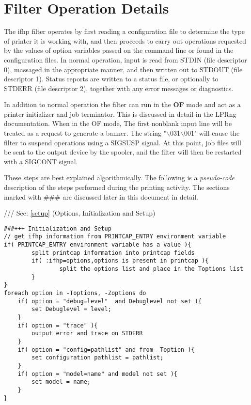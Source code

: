 \documentclass[a4paper]{article}
\begin{document}
\section{Filter Operation Details}

The
{\ttfamily ifhp}
filter operates by first reading a configuration file
to determine the type of printer it is working with,
and then proceeds to carry out operations requested by the values of
option variables passed on the command line or found in the configuration
files.
In normal operation,
input is read from 
{\ttfamily STDIN}
(file descriptor 0),
massaged in the appropriate manner,
and then written out to
{\ttfamily STDOUT} (file descriptor 1).
Status reports are written to
a status file, or optionally to
{\ttfamily STDERR} (file descriptor 2),
together with any error messages or diagnostics.

In addition to normal operation
the filter can run in the
{\bfseries OF} mode and act as a printer initializer and job terminator.
This is discussed in detail in the LPRng documentation.
When in the OF mode,
The first nonblank input line will be treated as
a request to generate a banner.
The string "$\backslash$031$\backslash$001" will cause the filter to suspend operations
using a SIGSUSP signal.
At this point,
job files will be sent to the output device by the spooler,
and the filter will then be restarted with a SIGCONT signal.

These steps are best explained algorithmically.
The following is a {\itshape pseudo-code\/} description of the steps
performed during the printing activity.
The sections marked with {\ttfamily \#\#\#} are discussed later in this document
in detail.

{\ttfamily ///} See: \ref{setup} {(Options, Initialization and Setup)}
\begin{tscreen}
\begin{verbatim}
###+++ Initialization and Setup
// get ifhp information from PRINTCAP_ENTRY environment variable
if( PRINTCAP_ENTRY environment variable has a value ){
        split printcap information into printcap fields
        if( :ifhp=options,options is present in printcap ){
                split the options list and place in the Toptions list
        }
}
foreach option in -Toptions, -Zoptions do
    if( option = "debug=level"  and Debuglevel not set ){
        set Debuglevel = level;
    }
    if( option = "trace" ){
        output error and trace on STDERR
    }
    if( option = "config=pathlist" and from -Toption ){
        set configuration pathlist = pathlist;
    }
    if( option = "model=name" and model not set ){
        set model = name;
    }
}
\end{verbatim}
\end{tscreen}
\end{document}
